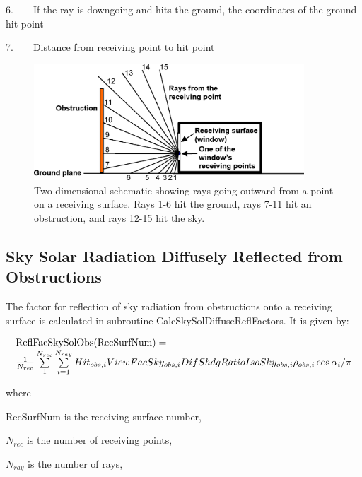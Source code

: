 6.~~~~If the ray is downgoing and hits the ground, the coordinates of the ground hit point

7.~~~~Distance from receiving point to hit point

\begin{figure}[hbtp] %
\centering
\includegraphics[width=0.9\textwidth, height=0.9\textheight, keepaspectratio=true]{media/image680.png}
\caption{Two-dimensional schematic showing rays going outward from a point on a receiving surface. Rays 1-6 hit the ground, rays 7-11 hit an obstruction, and rays 12-15 hit the sky. \protect \label{fig:two-dimensional-schematic-showing-rays-going}}
\end{figure}

\subsection{Sky Solar Radiation Diffusely Reflected from Obstructions}\label{sky-solar-radiation-diffusely-reflected-from-obstructions}

The factor for reflection of sky radiation from obstructions onto a receiving surface is calculated in subroutine CalcSkySolDiffuseReflFactors. It is given by:

\begin{equation}
\begin{array}{l}{\rm{ReflFacSkySolObs(RecSurfNum)}} = \\\frac{1}{{{N_{rec}}}}\sum\limits_1^{{N_{rec}}} {\sum\limits_{i = 1}^{{N_{ray}}} {Hi{t_{obs,i}}ViewFacSk{y_{obs,i}}DifShdgRatioIsoSk{y_{obs,i}}{\rho_{obs,i}}\cos {\alpha_i}/\pi } } \end{array}
\end{equation}

where

RecSurfNum is the receiving surface number,

\({N_{rec}}\) is the number of receiving points,

\({N_{ray}}\) is the number of rays,


